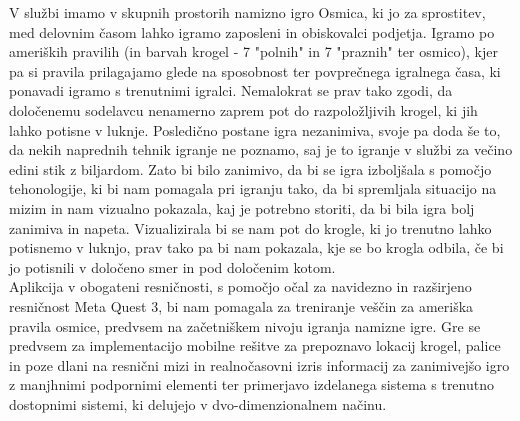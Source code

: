 \documentclass[a4paper, 12pt]{article}
\newcommand\cmnt[1]{\textcolor{munsell}{#1}}
\begin{document}
V službi imamo v skupnih prostorih namizno igro Osmica, ki jo za sprostitev, med delovnim časom lahko igramo
zaposleni in obiskovalci podjetja. Igramo po ameriških pravilih (in barvah krogel - 7 "polnih" in 7 "praznih" ter osmico), kjer pa si
pravila prilagajamo glede na sposobnost ter povprečnega igralnega časa, ki ponavadi igramo s trenutnimi igralci. Nemalokrat se prav tako
zgodi, da določenemu sodelavcu nenamerno zaprem pot do razpoložljivih krogel, ki jih lahko potisne v luknje. Posledično postane igra
nezanimiva, svoje pa doda še to, da nekih naprednih tehnik igranje ne poznamo, saj je to igranje v službi za večino edini stik z biljardom. 
Zato bi bilo zanimivo, da bi se igra izboljšala s pomočjo tehonologije, ki bi nam pomagala pri igranju tako, da bi spremljala situacijo na
mizim in nam vizualno pokazala, kaj je potrebno storiti, da bi bila igra bolj zanimiva in napeta. Vizualizirala bi se nam pot do 
krogle, ki jo trenutno lahko potisnemo v luknjo, prav tako pa bi nam pokazala, kje se bo krogla odbila, 
če bi jo potisnili v določeno smer in pod določenim kotom. \\Aplikcija v obogateni resničnosti, s pomočjo
očal za navidezno in razširjeno resničnost Meta Quest 3, bi nam pomagala za treniranje veščin za 
ameriška pravila osmice, predvsem na začetniškem nivoju igranja namizne igre. Gre se predvsem za implementacijo
mobilne rešitve za prepoznavo lokacij krogel, palice in poze dlani na resnični mizi in realnočasovni izris informacij
za zanimivejšo igro z manjhnimi podpornimi elementi ter primerjavo izdelanega sistema s trenutno dostopnimi sistemi,
ki delujejo v dvo-dimenzionalnem načinu.

\end{document}
